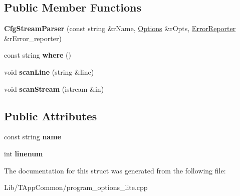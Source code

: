 \subsection*{Public Member Functions}
\begin{DoxyCompactItemize}
\item 
\mbox{\label{structdf_1_1program__options__lite_1_1_cfg_stream_parser_a22c100e9cf758b4bf0adb65bfb25424b}} 
{\bfseries Cfg\+Stream\+Parser} (const string \&r\+Name, \hyperlink{structdf_1_1program__options__lite_1_1_options}{Options} \&r\+Opts, \hyperlink{structdf_1_1program__options__lite_1_1_error_reporter}{Error\+Reporter} \&r\+Error\+\_\+reporter)
\item 
\mbox{\label{structdf_1_1program__options__lite_1_1_cfg_stream_parser_a7ee5e9e3e518eb4a3289cd40c0883c9a}} 
const string {\bfseries where} ()
\item 
\mbox{\label{structdf_1_1program__options__lite_1_1_cfg_stream_parser_a2ce0529549147ca927343f8d8087cad2}} 
void {\bfseries scan\+Line} (string \&line)
\item 
\mbox{\label{structdf_1_1program__options__lite_1_1_cfg_stream_parser_a217e7930e78de71d15f7221ecf2bdbca}} 
void {\bfseries scan\+Stream} (istream \&in)
\end{DoxyCompactItemize}
\subsection*{Public Attributes}
\begin{DoxyCompactItemize}
\item 
\mbox{\label{structdf_1_1program__options__lite_1_1_cfg_stream_parser_a741c54e6b713aa3832d254b0d4a3a1f3}} 
const string {\bfseries name}
\item 
\mbox{\label{structdf_1_1program__options__lite_1_1_cfg_stream_parser_a7e29e76109fccd236c1433fff76cf51e}} 
int {\bfseries linenum}
\end{DoxyCompactItemize}


The documentation for this struct was generated from the following file\+:\begin{DoxyCompactItemize}
\item 
Lib/\+T\+App\+Common/program\+\_\+options\+\_\+lite.\+cpp\end{DoxyCompactItemize}
